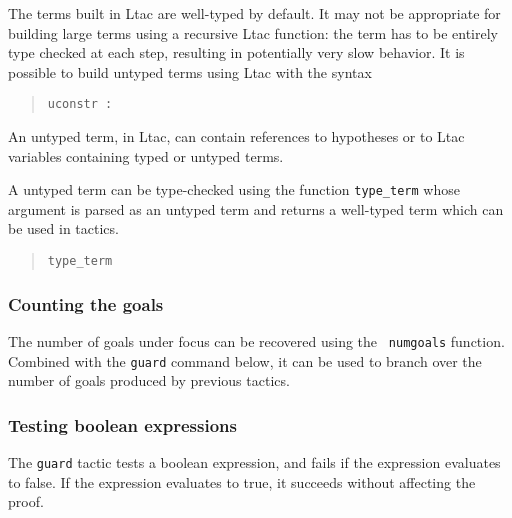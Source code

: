 The terms built in Ltac are well-typed by default. It may not be
appropriate for building large terms using a recursive Ltac function:
the term has to be entirely type checked at each step, resulting in
potentially very slow behavior. It is possible to build untyped terms using Ltac with the syntax

\begin{quote}
{\tt uconstr :} {\term}
\end{quote}

An untyped term, in Ltac, can contain references to hypotheses or to
Ltac variables containing typed or untyped terms.

A untyped term can be type-checked using the function {\tt type\_term}
whose argument is parsed as an untyped term and returns a well-typed
term which can be used in tactics.

\begin{quote}
{\tt type\_term} {\term}
\end{quote}

\subsubsection[Counting the goals]{Counting the goals}

The number of goals under focus can be recovered using the {\tt
  numgoals} function. Combined with the {\tt guard} command below, it
can be used to branch over the number of goals produced by previous tactics.



\subsubsection[Testing boolean expressions]{Testing boolean expressions}

The {\tt guard} tactic tests a boolean expression, and fails if the expression evaluates to false. If the expression evaluates to true, it succeeds without affecting the proof.

